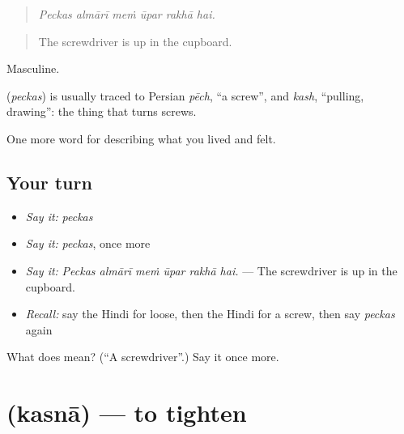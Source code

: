 \begin{quote}
     
\end{quote}

\begin{quote}
\emph{Peckas almārī meṁ ūpar rakhā hai.}
\end{quote}

\begin{quote}
The screwdriver is up in the cupboard.
\end{quote}

Masculine.

\begin{cousinweb}
\textbf{} (\emph{peckas}) is usually traced to Persian \emph{pēch}, \textquotedblleft{}a screw\textquotedblright{}, and \emph{kash}, \textquotedblleft{}pulling, drawing\textquotedblright{}: the thing that turns screws.
\end{cousinweb}

\begin{grammarlens}[title={What you've built}]
One more word for describing what you lived and felt.
\end{grammarlens}

\subsection*{Your turn}
\begin{itemize}
\raggedright
  \item \emph{Say it:} \emph{peckas}
  \item \emph{Say it:} \emph{peckas}, once more
  \item \emph{Say it:} \emph{Peckas almārī meṁ ūpar rakhā hai.} — The screwdriver is up in the cupboard.
  \item \emph{Recall:} say the Hindi for loose, then the Hindi for a screw, then say \emph{peckas} again
\end{itemize}

\begin{tcolorbox}[breakable,colback=teal!4,colframe=teal!35!black,title={Before you move on}]
What does  mean? (\textquotedblleft{}A screwdriver\textquotedblright{}.) Say it once more.
\end{tcolorbox}
\section[\texorpdfstring{\hi{कसना} (kasnā)}{कसना (kasnā)}]{ (kasnā) — to tighten}

